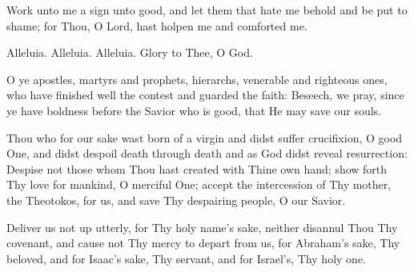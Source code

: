 {\begin{maybetwocolumns}





Work unto me a sign unto good, and let them that hate me behold and be put to shame;
for Thou, O Lord, hast holpen me and comforted me.

\end{maybetwocolumns}

\begin{reader}
  \item \gne
  \item Alleluia. Alleluia. Alleluia. Glory to Thee, O God. \thrice
  \item \lhmThree
  \item \glory
\end{reader}

\begin{maybetwocolumns}
O ye apostles, martyrs and prophets, hierarchs,
venerable and righteous ones, who have 
finished well the contest and guarded the faith:
Beseech, we pray, since ye have boldness 
before the Savior who is good, that He may save our souls.

\readerline{\nowandever}


Thou who for our sake wast born of a virgin and didst suffer crucifixion,
O good One, 
and didst despoil death through death and as God didst reveal resurrection:
Despise not those whom Thou hast created with Thine own hand;
show forth Thy love for mankind,
O merciful One; accept the intercession of Thy mother, the Theotokos,
for us, and save Thy despairing people, O our Savior.

\vbox{}
Deliver us not up utterly, for Thy holy name’s sake,
neither disannul Thou Thy covenant, 
and cause not Thy mercy to depart from us,
for Abraham’s sake, Thy beloved,
and for Isaac’s sake, Thy servant,
and for Israel’s, Thy holy one.
\end{maybetwocolumns}

\trisagionNeedsAmen{}


\begin{maybetwocolumns}


\end{maybetwocolumns}}
